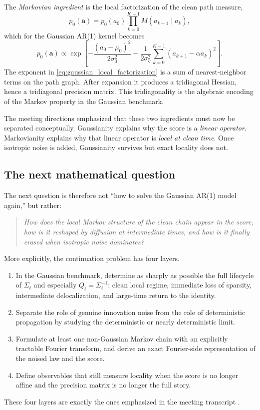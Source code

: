 \documentclass[11pt]{article}
\begin{document}
\begin{definition}
The \emph{Markovian ingredient} is the local factorization of the clean path measure,
\begin{equation}
 p_0(\mathbf a)=p_0(a_0)\prod_{k=0}^{K-1} M(a_{k+1}\mid a_k),
\end{equation}
which for the Gaussian AR(1) kernel becomes
\begin{equation}\label{eq:gaussian_local_factorization}
 p_0(\mathbf a)
 \propto
 \exp\!\left[-\frac{(a_0-\mu_0)^2}{2\sigma_0^2}
 -\frac{1}{2\sigma_\eta^2}\sum_{k=0}^{K-1}(a_{k+1}-\alpha a_k)^2\right].
\end{equation}
The exponent in \eqref{eq:gaussian_local_factorization} is a sum of nearest-neighbor terms on the path graph. After expansion it produces a tridiagonal Hessian, hence a tridiagonal precision matrix. This tridiagonality is the algebraic encoding of the Markov property in the Gaussian benchmark.
\end{definition}

The meeting directions emphasized that these two ingredients must now be separated conceptually. Gaussianity explains why the score is a \emph{linear operator}. Markovianity explains why that linear operator is \emph{local at clean time}. Once isotropic noise is added, Gaussianity survives but exact locality does not.

\subsection{The next mathematical question}

The next question is therefore not ``how to solve the Gaussian AR(1) model again,'' but rather:
\begin{quote}
\emph{How does the local Markov structure of the clean chain appear in the score, how is it reshaped by diffusion at intermediate times, and how is it finally erased when isotropic noise dominates?}
\end{quote}
More explicitly, the continuation problem has four layers.
\begin{enumerate}[label=(\roman*),leftmargin=1.2cm]
\item In the Gaussian benchmark, determine as sharply as possible the full lifecycle of $\Sigma_t$ and especially $Q_t=\Sigma_t^{-1}$: clean local regime, immediate loss of sparsity, intermediate delocalization, and large-time return to the identity.
\item Separate the role of genuine innovation noise from the role of deterministic propagation by studying the deterministic or nearly deterministic limit.
\item Formulate at least one non-Gaussian Markov chain with an explicitly tractable Fourier transform, and derive an exact Fourier-side representation of the noised law and the score.
\item Define observables that still measure locality when the score is no longer affine and the precision matrix is no longer the full story.
\end{enumerate}
These four layers are exactly the ones emphasized in the meeting transcript \cite{meetingtranscript}.
\end{document}
